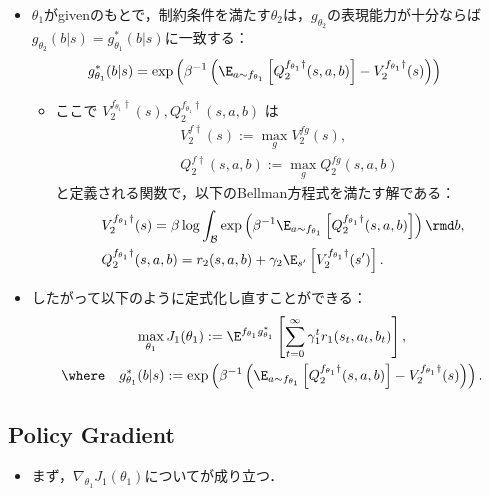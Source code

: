 \documentclass[a4paper,10pt,dvipdfmx]{jsarticle}
\begin{document}
\begin{itemize}
    \item $\theta_1$がgivenのもとで，制約条件を満たす$\theta_2$は，$g_{\theta_2}$の表現能力が十分ならば$g_{\theta_2}(b|s)=g_{\theta_1}^*(b|s)$に一致する：
    \begin{align}
        g_{\theta_1}^*(b|s)&=\exp\left(\beta^{-1}\left(\E_{a\sim f_{\theta_1}}\left[Q_2^{f_{\theta_1}\dag}(s,a,b)\right]-V_2^{f_{\theta_1}\dag}(s)\right)\right)
    \end{align}
    \begin{itemize}
        \item ここで $V_2^{f_{\theta_1}\dag}(s), Q_2^{f_{\theta_1}\dag}(s,a,b)$ は
        \begin{align}
            &V_2^{f\dag}(s):=\max_{g}V_2^{fg}(s),\\
            &Q_2^{f\dag}(s,a,b):=\max_{g}Q_2^{fg}(s,a,b)
        \end{align}
        と定義される関数で，以下のBellman方程式を満たす解である：
        \begin{align}
            &V_2^{f_{\theta_1}\dag}(s)=\beta\log\int_{\mathcal{B}}\exp\left(\beta^{-1}\E_{a\sim f_{\theta_1}}\left[Q_2^{f_{\theta_1}\dag}(s,a,b)\right]\right)\rmd b,\\
            &Q_2^{f_{\theta_1}\dag}(s,a,b)=r_2(s,a,b)+\gamma_2\E_{s'}\left[V_2^{f_{\theta_1}\dag}(s')\right].
        \end{align}
    \end{itemize}
    \item したがって以下のように定式化し直すことができる：
    \begin{subequations}
    \begin{gather}
        \max_{\theta_1} J_1(\theta_1):=\E^{f_{\theta_1}g_{\theta_1}^*}\left[\sum_{t=0}^\infty \gamma_1^tr_1(s_t,a_t,b_t)\right],\\
        \where\quad g_{\theta_1}^*(b|s):=\exp\left(\beta^{-1}\left(\E_{a\sim f_{\theta_1}}\left[Q_2^{f_{\theta_1}\dag}(s,a,b)\right]-V_2^{f_{\theta_1}\dag}(s)\right)\right).
    \end{gather}
    \end{subequations}    
\end{itemize}


\subsection{Policy Gradient}

\begin{itemize}
    \item まず，$\nabla_{\theta_1}J_1(\theta_1)$についてが成り立つ．
\end{itemize}
\end{document}
